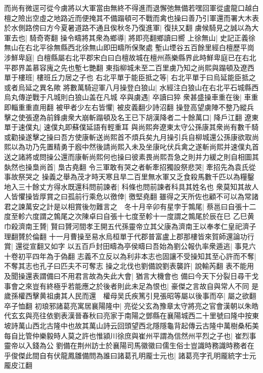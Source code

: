 而尚有微逕可從今虜將以大軍當由無終不得進而退懈弛無備若嘿回軍從盧龍口越白檀之險出空虛之地路近而便掩其不備蹋頓可不戰而禽也操曰善乃引軍還而署大木表於水側路傍曰方今夏暑道路不通且俟秋冬乃復進軍|{
	復扶又翻}
虜候騎見之誠以為大軍去也|{
	騎奇寄翻}
操令疇將其衆為鄉導|{
	將即亮翻鄉讀曰嚮}
上徐無山|{
	史記正義徐無山在右北平徐無縣西北徐無山即田疇所保聚處}
塹山堙谷五百餘里經白檀歷平崗涉鮮卑庭|{
	白檀縣屬右北平郡宋白曰白檀故城在檀州燕樂縣界此時鮮卑庭已在右北平郡界盖慕容廆之先也塹七艷翻}
東指柳城未至二百里虜乃知之尚熙與蹋頓及遼西單于樓班|{
	樓班丘力居之子也}
右北平單于能臣抵之等|{
	右北平單于曰烏延能臣抵之或者烏延之異名歟}
將數萬騎迎軍八月操登白狼山|{
	水經注白狼山在右北平石城縣西烏丸傳逆戰于凡城則白狼山盖在凡城}
卒與虜遇|{
	卒讀曰猝}
衆甚盛操車重在後|{
	車重即輜重重直用翻}
被甲者少左右皆懼|{
	被皮義翻少詩沼翻}
操登高望虜陣不整乃縱兵擊之使張遼為前鋒虜衆大崩斬蹋頓及名王已下胡漢降者二十餘萬口|{
	降戶江翻}
遼東單于速僕丸|{
	速僕丸即蘇僕延語有輕重耳}
與尚熙奔遼東太守公孫康其衆尚有數千騎或勸操遂擊之操曰吾方使康斬送尚熙首不煩兵矣九月操引兵自柳城還公孫康欲取尚熙以為功乃先置精勇于廏中然後請尚熙入未及坐康叱伏兵禽之遂斬尚熙并速僕丸首送之諸將或問操公還而康斬尚熙何也操曰彼素畏尚熙吾急之則并力緩之則自相圖其埶然也操梟尚首|{
	梟古堯翻}
令三軍敢有哭之者斬牽招獨設祭悲哭|{
	牽招先為袁氏從事故祭哭之}
操義之舉為茂才時天寒且旱二百里無水軍又乏食殺馬數千匹以為糧鑿地入三十餘丈方得水既還科問前諫者|{
	科條也問前諫者科具其姓名也}
衆莫知其故人人皆懼操皆厚賞之曰孤前行乘危以徼倖|{
	徼堅堯翻}
雖得之天所佐也顧不可以為常諸君之諫萬安之計是以相賞後勿難言之　冬十月辛卯有星孛于鶉尾|{
	蔡邕曰自張十二度至軫六度謂之鶉尾之次陳卓曰自張十七度至軫十一度謂之鶉尾於辰在巳}
乙巳黄巾殺濟南王贇|{
	賢曰贇河間孝王開五代孫靈帝立其父康為濟南王以奉孝仁皇祀濟子理翻贇於倫翻}
十一月曹操至易水烏桓單于代郡普富盧上郡那樓皆來賀師還論功行賞|{
	還從宣翻又如字}
以五百戶封田疇為亭侯疇曰吾始為劉公報仇率衆遁逃|{
	事見六十卷初平四年為于偽翻}
志義不立反以為利非本志也固讓不受操知其至心許而不奪|{
	不奪其志也孔子曰匹夫不可奪志}
操之北伐也劉備說劉表襲許|{
	說輸芮翻}
表不能用及聞操還表謂備曰不用君言故為失此大會|{
	猶言大機會也}
備曰今天下分裂日尋干戈事會之來豈有終極乎若能應之於後者則此未足為恨也|{
	豪傑之言故自與常人不同}
是歲孫權西擊黄祖虜其人民而還　權母吴氏疾篤引見張昭等屬以後事而卒|{
	屬之欲翻卒子恤翻}
初琅邪諸葛亮寓居襄陽隆中|{
	亮從父玄為豫章太守將亮之官會漢朝以朱皓代玄玄與亮往依劉表漢晉春秋曰亮家于南陽之鄧縣在襄陽城西二十里號曰隆中按東坡詩萬山西北古隆中也故其萬山詩云回頭望西北隱隱龜背起傳云古隆中萬樹桑柘美}
每自比管仲樂毅時人莫之許也惟潁川徐庶與崔州平謂為信然州平烈之子也|{
	崔烈事靈帝以入錢為公}
劉備在荆州訪士於襄陽司馬徽徽曰儒生俗士豈識時務識時務者在乎俊傑此間自有伏龍鳳雛備問為誰曰諸葛孔明龎士元也|{
	諸葛亮字孔明龎統字士元龎皮江翻}
